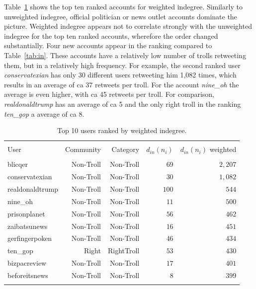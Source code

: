 \documentclass[12pt, titlepage=true, toc=bib]{scrartcl}
\begin{document}
Table~\ref{tab:win} shows the top ten ranked accounts for weighted indegree. Similarly to unweighted indegree, official politician or news outlet accounts dominate the picture. Weighted indegree appears not to correlate strongly with the unweighted indegree for the top ten ranked accounts, wherefore the order changed substantially. Four new accounts appear in the ranking compared to Table~\ref{tab:in}. These accounts have a relatively low number of trolls retweeting them, but in a relatively high frequency. For example, the second ranked user \textit{conservatexian} has only 30 different users retweeting him 1,082 times, which results in an average of ca 37 retweets per troll. For the account \textit{nine\_oh} the average is even higher, with ca 45 retweets per troll. For comparison, \textit{realdonaldtrump} has an average of ca 5 and the only right troll in the ranking \textit{ten\_gop} a average of ca 8.

\begin{table}[!ht] \centering 
  \begin{tabular*}{.95\linewidth}{@{\extracolsep{\fill}} lrrrr} 
\\[-1.8ex]\hline 
\hline \\[-1.8ex] 
User & Community & Category & \( d_{in}(n_{i}) \) & \( d_{in}(n_{i}) \) weighted \\ 
\hline \\[-1.8ex] 
blicqer & Non-Troll & Non-Troll & $69$ & $2,207$ \\ 
conservatexian & Non-Troll & Non-Troll & $30$ & $1,082$ \\ 
realdonaldtrump & Non-Troll & Non-Troll & $100$ & $544$ \\ 
nine\_oh & Non-Troll & Non-Troll & $11$ & $500$ \\ 
prisonplanet & Non-Troll & Non-Troll & $56$ & $462$ \\ 
zaibatsunews & Non-Troll & Non-Troll & $16$ & $451$ \\ 
gerfingerpoken & Non-Troll & Non-Troll & $46$ & $434$ \\ 
ten\_gop & Right & RightTroll & $53$ & $430$ \\ 
bizpacreview & Non-Troll & Non-Troll & $17$ & $401$ \\ 
beforeitsnews & Non-Troll & Non-Troll & $8$ & $399$ \\ 
\hline \\[-1.8ex] 
\end{tabular*} 
\caption[Indegree weighted]{Top 10 users ranked by weighted indegree.} 
  \label{tab:win} 
\end{table}
\end{document}
